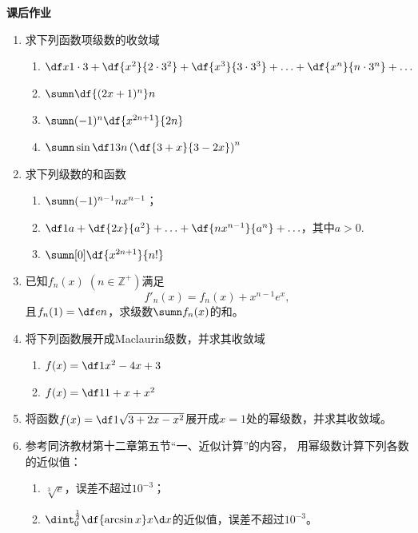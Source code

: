 \begin{ext}
	{\bf 课后作业}
	\begin{enumerate}
	  \item 求下列函数项级数的收敛域
	  \begin{enumerate}[(1)]
	    \item $\df x{1\cdot 3}+\df{x^2}{2\cdot3^2}+\df{x^3}{3\cdot3^3}
	    +\ldots+\df{x^n}{n\cdot3^n}+\ldots$
	    \item $\sumn\df{(2x+1)^n}n$
	    \item $\sumn(-1)^n\df{x^{2n+1}}{2n}$
	    \item $\sumn\sin\df 1 {3n}\left(\df{3+x}{3-2x}\right)^n$
	  \end{enumerate}
	  \item 求下列级数的和函数
		\begin{enumerate}[(1)]
		  \item $\sumn(-1)^{n-1}nx^{n-1}$；
		  \item $\df1a+\df{2x}{a^2}+\ldots+\df{nx^{n-1}}{a^n}+\ldots$，其中$a>0$.
		  \item $\sumn[0]\df{x^{2n+1}}{n!}$
		\end{enumerate}
	  \item 已知$f_n(x)\;(n\in\mathbb{Z}^+)$满足
		$$f'_n(x)=f_n(x)+x^{n-1}e^x,$$
		且$f_n(1)=\df en$，求级数$\sumn f_n(x)$的和。
	  \item 将下列函数展开成Maclaurin级数，并求其收敛域
		\begin{enumerate}[(1)]
		  \item $f(x)=\df1{x^2-4x+3}$
		  \item $f(x)=\df 1{1+x+x^2}$
		\end{enumerate}
	  \item 将函数$f(x)=\df1{\sqrt{3+2x-x^2}}$展开成$x=1$处的幂级数，并求其收敛域。
	  \item 参考{\kaishu 同济教材第十二章第五节“一、近似计算”}的内容，
	  用幂级数计算下列各数的近似值：
	  \begin{enumerate}[(1)]
	    \item $\sqrt[3]e$，误差不超过$10^{-3}$；
	    \item $\dint_0^{\frac12}\df{\arcsin x}x\d x$的近似值，误差不超过$10^{-3}$。 
	  \end{enumerate}
	\end{enumerate}
\end{ext}

